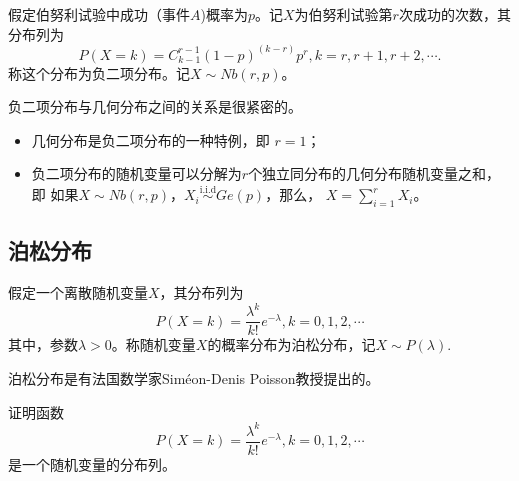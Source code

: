 \begin{definition}\label{def:negative_binomial_dist}
	假定伯努利试验中成功（事件$A$)概率为$p$。记$X$为伯努利试验第$r$次成功的次数，其分布列为
	$$
	P(X=k) =   C_{k-1}^{r-1} (1-p)^{(k-r)}p^{r}, k=r,r+1,r+2,\cdots.
	$$
	称这个分布为负二项分布。记$X\sim Nb(r,p)$。
\end{definition}
\begin{remark}
负二项分布与几何分布之间的关系是很紧密的。

\begin{itemize}
    \item 几何分布是负二项分布的一种特例，即
$r=1$；
\item 负二项分布的随机变量可以分解为$r$个独立同分布的几何分布随机变量之和，即
	如果$X \sim Nb(r,p)$，$X_i \overset{\text{i.i.d}}{\sim} Ge(p) $，那么， $X = \sum_{i=1}^r X_i$。
\end{itemize}
\end{remark}

\subsection{泊松分布}
\begin{definition}
   假定一个离散随机变量$X$，其分布列为
    $$P(X=k)=\frac{\lambda ^{k} }{k!} e^{-\lambda } ,k=0,1,2,\cdots $$
    其中，参数$\lambda >0$。称随机变量$X$的概率分布为泊松分布，记$X\sim P(\lambda)$.
\end{definition}

泊松分布是有法国数学家Siméon-Denis Poisson教授提出的。


\begin{theorem}
证明函数
$$P(X=k)=\frac{\lambda ^{k} }{k!} e^{-\lambda } ,k=0,1,2,\cdots $$是一个随机变量的分布列。
\end{theorem}

